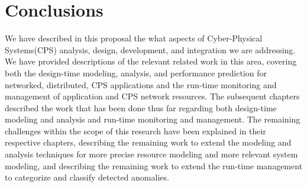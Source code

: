 \chapter{Conclusions}
\label{ch:conclusions}

We have described in this proposal the what aspects of Cyber-Physical
Systems(CPS) analysis, design, development, and integration we are
addressing.  We have provided descriptions of the relevant related
work in this area, covering both the design-time modeling, analysis,
and performance prediction for networked, distributed, CPS
applications and the run-time monitoring and management of application
and CPS network resources.  The subsequent chapters described the work
that has been done thus far regarding both design-time modeling and
analysis and run-time monitoring and management.  The remaining
challenges within the scope of this research have been explained in
their respective chapters, describing the remaining work to extend the
modeling and analysis techniques for more precise resource modeling
and more relevant system modeling, and describing the remaining work
to extend the run-time management to categorize and classify detected
anomalies.
